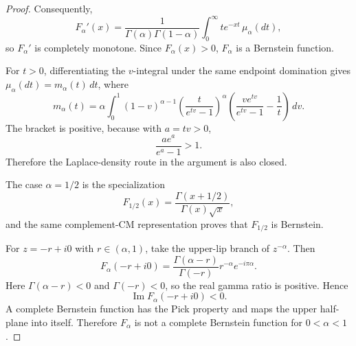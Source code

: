 \begin{proof}
Consequently,
\[
F_\alpha'(x)
=
\frac{1}{\Gamma(\alpha)\Gamma(1-\alpha)}
\int_0^\infty t e^{-xt}\,\mu_\alpha(dt),
\]
so \(F_\alpha'\) is completely monotone. Since \(F_\alpha(x)>0\), \(F_\alpha\) is a Bernstein function.

For \(t>0\), differentiating the \(v\)-integral under the same endpoint domination gives \(\mu_\alpha(dt)=m_\alpha(t)\,dt\), where
\[
m_\alpha(t)
=
\alpha\int_0^1
(1-v)^{\alpha-1}
\left(\frac{t}{e^{tv}-1}\right)^\alpha
\left(
\frac{v e^{tv}}{e^{tv}-1}-\frac1t
\right)\,dv.
\]
The bracket is positive, because with \(a=tv>0\),
\[
\frac{a e^a}{e^a-1}>1.
\]
Therefore the Laplace-density route in the argument is also closed.

The case \(\alpha=1/2\) is the specialization
\[
F_{1/2}(x)=\frac{\Gamma(x+1/2)}{\Gamma(x)\sqrt{x}},
\]
and the same complement-CM representation proves that \(F_{1/2}\) is Bernstein.

For \(z=-r+i0\) with \(r\in(\alpha,1)\), take the upper-lip branch of \(z^{-\alpha}\). Then
\[
F_\alpha(-r+i0)
=
\frac{\Gamma(\alpha-r)}{\Gamma(-r)}r^{-\alpha}e^{-i\pi\alpha}.
\]
Here \(\Gamma(\alpha-r)<0\) and \(\Gamma(-r)<0\), so the real gamma ratio is positive. Hence
\[
\operatorname{Im} F_\alpha(-r+i0)<0.
\]
A complete Bernstein function has the Pick property and maps the upper half-plane into itself. Therefore \(F_\alpha\) is not a complete Bernstein function for \(0<\alpha<1\).
\end{proof}

